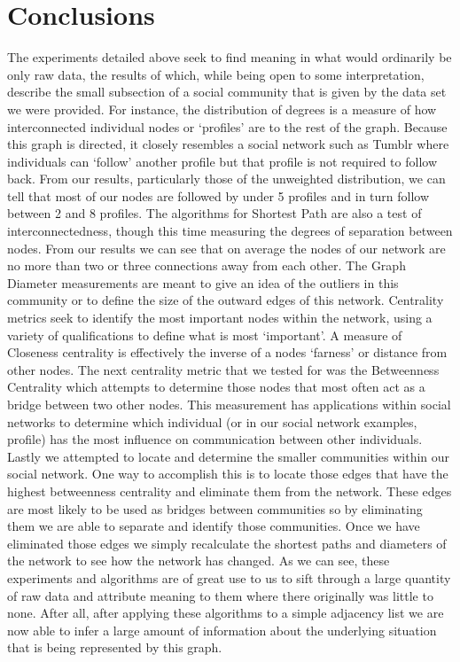 \documentclass{article}
\begin{document}
\section{Conclusions}
The experiments detailed above seek to find meaning in what would ordinarily be only raw data, the results of which, while being open to some interpretation, describe the small subsection of a social community that is given by the data set we were provided. For instance, the distribution of degrees is a measure of how interconnected individual nodes or ‘profiles’ are to the rest of the graph. Because this graph is directed, it closely resembles a social network such as Tumblr where individuals can ‘follow’ another profile but that profile is not required to follow back. From our results, particularly those of the unweighted distribution, we can tell that most of our nodes are followed by under 5 profiles and in turn follow between 2 and 8 profiles. The algorithms for Shortest Path are also a test of interconnectedness, though this time measuring the degrees of separation between nodes. From our results we can see that on average the nodes of our network are no more than two or three connections away from each other. The Graph Diameter measurements are meant to give an idea of the outliers in this community or to define the size of the outward edges of this network. Centrality metrics seek to identify the most important nodes within the network, using a variety of qualifications to define what is most ‘important’.  A measure of Closeness centrality is effectively the inverse of a nodes ‘farness’ or distance from other nodes. The next centrality metric that we tested for was the Betweenness Centrality which attempts to determine those nodes that most often act as a bridge between two other nodes. This measurement has applications within social networks to determine which individual (or in our social network examples, profile) has the most influence on communication between other individuals. Lastly we attempted to locate and determine the smaller communities within our social network. One way to accomplish this is to locate those edges that have the highest betweenness centrality and eliminate them from the network. These edges are most likely to be used as bridges between communities so by eliminating them we are able to separate and identify those communities.  Once we have eliminated those edges we simply recalculate the shortest paths and diameters of the network to see how the network has changed. As we can see, these experiments and algorithms are of great use to us to sift through a large quantity of raw data and attribute meaning to them where there originally was little to none. After all, after applying these algorithms to a simple adjacency list we are now able to infer a large amount of information about the underlying situation that is being represented by this graph.
\end{document}
